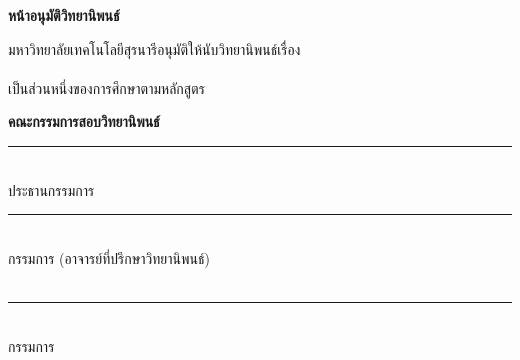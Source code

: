 \clearpage
\thispagestyle{empty}
\vspace*{0.5in}

\begin{center}
  {\bfseries\fontsize{20pt}{24pt}\selectfont หน้าอนุมัติวิทยานิพนธ์}
\end{center}

\vspace{2\baselineskip}
\noindent
มหาวิทยาลัยเทคโนโลยีสุรนารีอนุมัติให้นับวิทยานิพนธ์เรื่อง\\[0.5\baselineskip]
\textbf{\SUTTitleTHValue}\\[1.5\baselineskip]
เป็นส่วนหนึ่งของการศึกษาตามหลักสูตร \SUTDegreeTHValue

\vspace{2\baselineskip}
\noindent\textbf{คณะกรรมการสอบวิทยานิพนธ์}

\vspace{2\baselineskip}
\noindent\rule{2.8in}{0.4pt}\\
ประธานกรรมการ\\[2\baselineskip]
\rule{2.8in}{0.4pt}\\
กรรมการ (อาจารย์ที่ปรึกษาวิทยานิพนธ์)\\
\SUTAdvisorTHValue\\[2\baselineskip]
\rule{2.8in}{0.4pt}\\
กรรมการ

\clearpage
